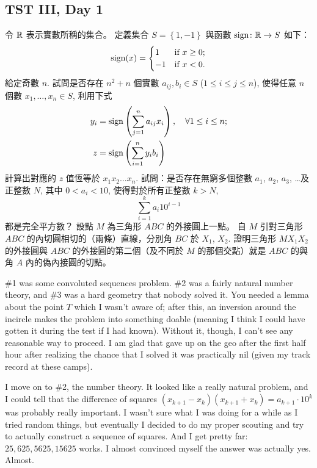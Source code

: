 \documentclass[11pt]{scrreprt}
\begin{document}
\subsection{TST III, Day 1}
\begin{enumerate}
  \ii 令 $\mathbb R$ 表示實數所稱的集合。 定義集合 $S = \left\{ 1,-1 \right\}$ 與函數 $\operatorname{sign} \colon \mathbb R \to S$ 如下：
  \[ \operatorname{sign}(x) =
    \begin{cases}
      1 & \text{if } x \ge 0; \\
      -1 & \text{if } x < 0.
    \end{cases} \]
  給定奇數 $n$. 試問是否存在 $n^2+n$ 個實數 $a_{ij}, b_i \in S$ ($1 \le i \le j \le n$),
  使得任意 $n$ 個數 $x_1, \dots, x_n \in S$, 利用下式
  \begin{align*}
    y_i &= \operatorname{sign} \left( \sum_{j=1}^n a_{ij} x_i \right), \quad \forall 1 \le i \le n; \\
    z &= \operatorname{sign} \left( \sum_{i=1}^n y_i b_i \right)
  \end{align*}
  計算出對應的 $z$ 值恆等於 $x_1x_2 \dots x_n$.
  \ii 試問：是否存在無窮多個整數 $a_1$, $a_2$, $a_3$, \dots 及正整數 $N$, 其中 $0 < a_i < 10$, 使得對於所有正整數 $k > N$,
  \[ \sum_{i=1}^k a_i 10^{i-1} \]
  都是完全平方數？ %
  \ii 設點 $M$ 為三角形 $ABC$ 的外接圓上一點。 自 $M$ 引對三角形 $ABC$
  的內切圓相切的（兩條）直線，分別角 $BC$ 於 $X_1$, $X_2$.
  證明三角形 $MX_1X_2$ 的外接圓與 $ABC$ 的外接圓的第二個（及不同於 $M$ 的那個交點）就是
  $ABC$ 的與角 $A$ 內的偽內接圓的切點。
\end{enumerate}
\#1 was some convoluted sequences problem. \#2 was a fairly natural number theory, and \#3 was a hard geometry that nobody solved it. You needed a lemma about the point $T$ which I wasn't aware of; after this, an inversion around the incircle makes the problem into something doable (meaning I think I could have gotten it during the test if I had known). Without it, though, I can't see any reasonable way to proceed. I am glad that gave up on the geo after the first half hour after realizing the chance that I solved it was practically nil (given my track record at these camps).

I move on to \#2, the number theory.
It looked like a really natural problem,
and I could tell that the difference of squares
$\left( x_{k+1}-x_k \right)\left( x_{k+1}+x_k \right) = a_{k+1} \cdot 10^k$ was probably really important.
I wasn't sure what I was doing for a while as I tried random things,
but eventually I decided to do my proper scouting and try to actually construct a sequence of squares.
And I get pretty far: $25,625,5625,15625$ works. I almost convinced myself the answer was actually yes.
Almost.
\end{document}
